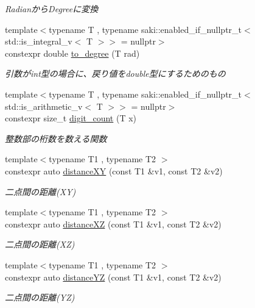 \begin{DoxyCompactItemize}
\begin{DoxyCompactList}\small\item\em Radianから\+Degreeに変換 \end{DoxyCompactList}\item 
{\footnotesize template$<$typename T , typename saki\+::enabled\+\_\+if\+\_\+nullptr\+\_\+t$<$ std\+::is\+\_\+integral\+\_\+v$<$ T $>$$>$  = nullptr$>$ }\\constexpr double \mbox{\hyperlink{namespacesaki_aa7cb33956f8d7354b485aee878d7805d}{to\+\_\+degree}} (T rad)
\begin{DoxyCompactList}\small\item\em 引数がint型の場合に、戻り値をdouble型にするためのもの \end{DoxyCompactList}\item 
{\footnotesize template$<$typename T , typename saki\+::enabled\+\_\+if\+\_\+nullptr\+\_\+t$<$ std\+::is\+\_\+arithmetic\+\_\+v$<$ T $>$$>$  = nullptr$>$ }\\constexpr size\+\_\+t \mbox{\hyperlink{namespacesaki_a467dee57b7bbe101146713a82acfe95e}{digit\+\_\+count}} (T x)
\begin{DoxyCompactList}\small\item\em 整数部の桁数を数える関数 \end{DoxyCompactList}\item 
{\footnotesize template$<$typename T1 , typename T2 $>$ }\\constexpr auto \mbox{\hyperlink{namespacesaki_a3fc5f53a2ad96fd68998eb3cc69b7b14}{distance\+XY}} (const T1 \&v1, const T2 \&v2)
\begin{DoxyCompactList}\small\item\em 二点間の距離(\+X\+Y) \end{DoxyCompactList}\item 
{\footnotesize template$<$typename T1 , typename T2 $>$ }\\constexpr auto \mbox{\hyperlink{namespacesaki_a00cde91612dbac84d9720bf92a8ab9c6}{distance\+XZ}} (const T1 \&v1, const T2 \&v2)
\begin{DoxyCompactList}\small\item\em 二点間の距離(\+X\+Z) \end{DoxyCompactList}\item 
{\footnotesize template$<$typename T1 , typename T2 $>$ }\\constexpr auto \mbox{\hyperlink{namespacesaki_a59a95407d1eab774038224739436170d}{distance\+YZ}} (const T1 \&v1, const T2 \&v2)
\begin{DoxyCompactList}\small\item\em 二点間の距離(\+Y\+Z) \end{DoxyCompactList}\item 

\end{DoxyCompactItemize}
